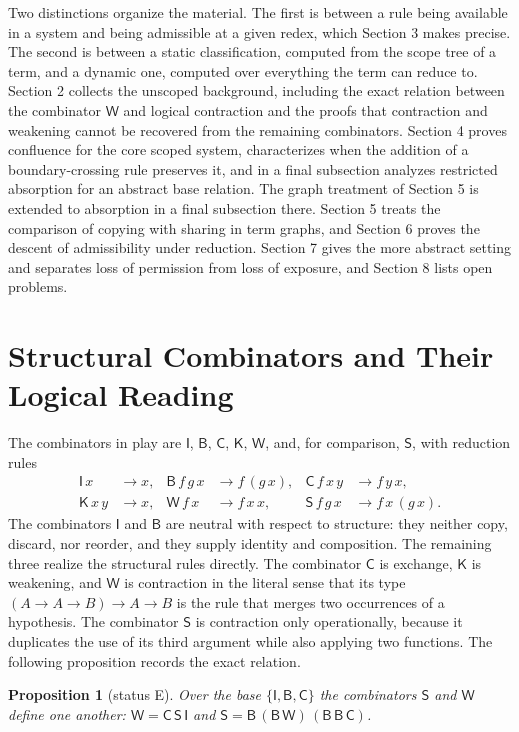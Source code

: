 \documentclass[11pt]{article}
\newtheorem{proposition}[theorem]{Proposition}
\theoremstyle{definition}
\theoremstyle{remark}
\newcommand{\cI}{\mathsf{I}}
\newcommand{\cB}{\mathsf{B}}
\newcommand{\cC}{\mathsf{C}}
\newcommand{\cK}{\mathsf{K}}
\newcommand{\cW}{\mathsf{W}}
\newcommand{\cS}{\mathsf{S}}
\newcommand{\Et}{status E}
\begin{document}
Two distinctions organize the material. The first is between a rule being available in a system and being admissible at a given redex, which Section 3 makes precise. The second is between a static classification, computed from the scope tree of a term, and a dynamic one, computed over everything the term can reduce to. Section 2 collects the unscoped background, including the exact relation between the combinator $\cW$ and logical contraction and the proofs that contraction and weakening cannot be recovered from the remaining combinators. Section 4 proves confluence for the core scoped system, characterizes when the addition of a boundary-crossing rule preserves it, and in a final subsection analyzes restricted absorption for an abstract base relation. The graph treatment of Section 5 is extended to absorption in a final subsection there. Section 5 treats the comparison of copying with sharing in term graphs, and Section 6 proves the descent of admissibility under reduction. Section 7 gives the more abstract setting and separates loss of permission from loss of exposure, and Section 8 lists open problems.

\section{Structural Combinators and Their Logical Reading}

The combinators in play are $\cI$, $\cB$, $\cC$, $\cK$, $\cW$, and, for comparison, $\cS$, with reduction rules
\begin{align*}
\cI\,x &\to x, &
\cB\,f\,g\,x &\to f\,(g\,x), &
\cC\,f\,x\,y &\to f\,y\,x,\\
\cK\,x\,y &\to x, &
\cW\,f\,x &\to f\,x\,x, &
\cS\,f\,g\,x &\to f\,x\,(g\,x).
\end{align*}
The combinators $\cI$ and $\cB$ are neutral with respect to structure: they neither copy, discard, nor reorder, and they supply identity and composition. The remaining three realize the structural rules directly. The combinator $\cC$ is exchange, $\cK$ is weakening, and $\cW$ is contraction in the literal sense that its type $(A\to A\to B)\to A\to B$ is the rule that merges two occurrences of a hypothesis. The combinator $\cS$ is contraction only operationally, because it duplicates the use of its third argument while also applying two functions. The following proposition records the exact relation.

\begin{proposition}[\Et]\label{prop:SW}
Over the base $\{\cI,\cB,\cC\}$ the combinators $\cS$ and $\cW$ define one another: $\cW=\cC\,\cS\,\cI$ and $\cS=\cB\,(\cB\,\cW)\,(\cB\,\cB\,\cC)$.
\end{proposition}
\end{document}
